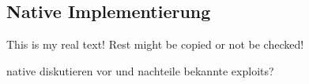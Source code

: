 \subsection{Native Implementierung} \label{subsection:evaluation-modifications-dynamic}
This is my real text! Rest might be copied or not be checked!


native diskutieren
vor und nachteile
bekannte exploits?
